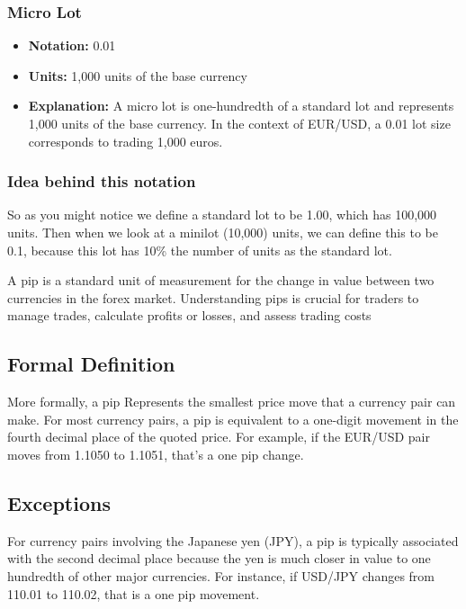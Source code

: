 \documentclass{report}
\begin{document}
     \subsubsection{Micro Lot}
     \bigbreak \noindent 
     \begin{itemize}
         \item \textbf{Notation:} 0.01
         \item \textbf{Units:} 1,000 units of the base currency
         \item \textbf{Explanation:} A micro lot is one-hundredth of a standard lot and represents 1,000 units of the base currency. In the context of EUR/USD, a 0.01 lot size corresponds to trading 1,000 euros.
     \end{itemize}
     \bigbreak \noindent 
     \subsubsection{Idea behind this notation}
     \bigbreak \noindent 
     So as you might notice we define a standard lot to be 1.00, which has 100,000 units. Then when we look at a minilot (10,000) units, we can define this to be 0.1, because this lot has 10\% the number of units as the standard lot.

     \pagebreak 
     \bigbreak \noindent 
     A pip is a standard unit of measurement for the change in value between two currencies in the forex market. Understanding pips is crucial for traders to manage trades, calculate profits or losses, and assess trading costs
     \bigbreak \noindent 
     \subsection{Formal Definition}
     \bigbreak \noindent 
     More formally, a pip Represents the smallest price move that a currency pair can make. For most currency pairs, a pip is equivalent to a one-digit movement in the fourth decimal place of the quoted price. For example, if the EUR/USD pair moves from 1.1050 to 1.1051, that's a one pip change.
     \bigbreak \noindent 
    \subsection{Exceptions}
    \bigbreak \noindent 
     For currency pairs involving the Japanese yen (JPY), a pip is typically associated with the second decimal place because the yen is much closer in value to one hundredth of other major currencies. For instance, if USD/JPY changes from 110.01 to 110.02, that is a one pip movement.
     \bigbreak \noindent 
\end{document}
